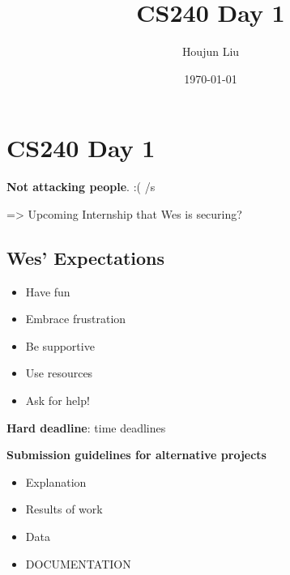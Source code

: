 \documentclass[letterpaper]{article}
\author{Houjun Liu}
\date{\today}
\title{CS240 Day 1}
\renewcommand\maketitle{}
\begin{document}
\maketitle


\section{CS240 Day 1}
\label{sec:org1d89f53}
\textbf{Not attacking people}. :( /s

=> Upcoming Internship that Wes is securing?

\subsection{Wes' Expectations}
\label{sec:org8483de3}
\begin{itemize}
\item Have fun
\item Embrace frustration
\item Be supportive
\item Use resources
\item Ask for help!
\end{itemize}

\textbf{Hard deadline}: time deadlines

\textbf{Submission guidelines for alternative projects}

\begin{itemize}
\item Explanation
\item Results of work
\item Data
\item DOCUMENTATION
\end{itemize}
\end{document}
